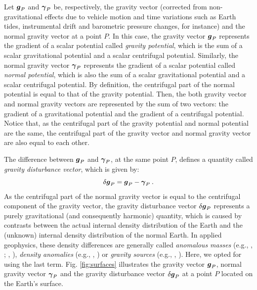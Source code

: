 \documentclass[extra]{gji}
\begin{document}
Let $\mitbf{g}_{P}$ and $\mitbf{\gamma}_{P}$ be, respectively, the 
gravity vector (corrected from non-gravitational effects due to vehicle 
motion and time variations such as Earth tides, instrumental drift and 
barometric pressure changes, for instance) and the normal gravity vector 
at a point $P$. 
In this case, the gravity vector $\mitbf{g}_{P}$ represents the 
gradient of a scalar potential called \textit{gravity potential}, 
which is the sum of a scalar gravitational potential and a 
scalar centrifugal potential.
Similarly, the normal gravity vector $\mitbf{\gamma}_{P}$ represents the 
gradient of a scalar potential called \textit{normal potential}, 
which is also the sum of a scalar gravitational potential and a 
scalar centrifugal potential.
By definition, the centrifugal part of the normal potential is equal 
to that of the gravity potential.
Then, the both gravity vector and normal gravity vectors are represented 
by the sum of two vectors: the gradient of a gravitational potential and
the gradient of a centrifugal potential. Notice that, as the centrifugal 
part of the gravity potential and normal potential are the same, the
centrifugal part of the gravity vector and normal gravity vector are
also equal to each other.

The difference between $\mitbf{g}_{P}$ and $\mitbf{\gamma}_{P}$, at the same 
point $P$, defines a quantity called \textit{gravity disturbance 
vector}, which is given by:
\begin{equation}
\delta \mitbf{g}_{P} = 
\mitbf{g}_{P} - \mitbf{\gamma}_{P} \: .
\label{eq:gravity-disturbance-vector}
\end{equation}
As the centrifugal part of the normal gravity vector 
is equal to the centrifugal component of the gravity vector, 
the gravity disturbance vector $\delta \mitbf{g}_{P}$ represents 
a purely gravitational (and consequently harmonic) quantity, which is 
caused by contrasts between the actual internal 
density distribution of the Earth and the (unknown) internal density 
distribution of the normal Earth.
In applied geophysics, these density differences are generally 
called \textit{anomalous masses} (e.g., \citeauthor{hammer1945}, 
\citeyear{hammer1945}; \citeauthor{lafehr1965}, \citeyear{lafehr1965}),
\textit{density anomalies} (e.g., \citeauthor{forsberg1984}, 
\citeyear{forsberg1984}) or \textit{gravity sources} (e.g., 
\citeauthor{blakely1996}, \citeyear{blakely1996}). Here, we opted for 
using the last term.
Fig. \ref{fig:surfaces} illustrates the gravity vector 
$\mitbf{g}_{P}$, normal gravity vector $\mitbf{\gamma}_{P}$ and 
the gravity disturbance vector $\delta \mitbf{g}_{P}$ at a point $P$ 
located on the Earth's surface.
\end{document}
